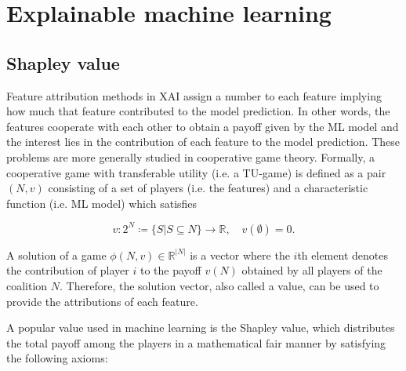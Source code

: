 \section{Explainable machine learning}


\subsection{Shapley value}
\label{subsec:shapley_value}

Feature attribution methods in XAI assign a number to each feature implying how
much that feature contributed to the model prediction.\cite{merrick2020explanation}
In other words, the features cooperate with each other to obtain a payoff given
by the ML model and the interest lies in the contribution of each feature to the
model prediction. These problems are more generally studied in cooperative game
theory. Formally, a cooperative game with transferable utility (i.e. a TU-game) is
defined as a pair $(N, v)$ consisting of a set of players (i.e. the features)
and a characteristic function (i.e. ML model) which satisfies\cite{zhang2022gstarx}


\begin{equation}
	v: 2^N \coloneqq \{S | S \subseteq N\} \rightarrow \mathbb{R}, \quad v\left(\emptyset\right) = 0.
\end{equation}


A solution of a game $\phi(N, v) \in \mathbb{R}^{|N|}$ is a vector where the $i$th element
denotes the contribution of player $i$ to the payoff $v(N)$ obtained by all players
of the coalition $N$.\cite{zhang2022gstarx} Therefore, the solution vector,
also called a value, can be used to provide the attributions of each feature.


A popular value used in machine learning is the Shapley value, which distributes
the total payoff among the players in a mathematical fair manner by satisfying the
following axioms:\cite{merrick2020explanation, shapley1953value}


